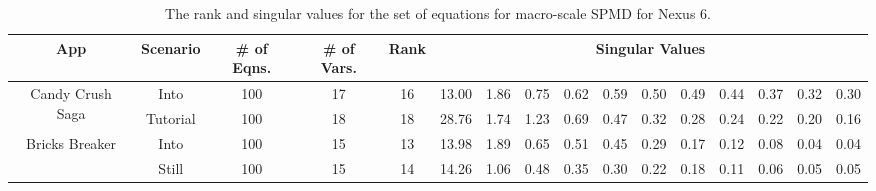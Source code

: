 \begin{table*}[tp]
{\small
    \centering
    \caption{The rank and singular values for the set of equations for macro-scale SPMD for Nexus 6.}
    \vspace{-0.1in}
    \begin{tabular}{|c|c|c|c|c|c|c|c|c|c|c|c|c|c|c|c|}
    \hline
        App & Scenario & \# of Eqns. & \# of Vars. & Rank &  \multicolumn{11}{c|}{Singular Values} \\
        \hline
        \multirow{2}{15mm}{Candy Crush Saga} & Into & 100 & 17 & 16 & 13.00  & 1.86  & 0.75  & 0.62  & 0.59  & 0.50  & 0.49  & 0.44  & 0.37  & 0.32  & 0.30 \\
        \cline{2-16}
	     & Tutorial &  100 & 18 & 18 & 28.76  & 1.74  & 1.23  & 0.69  & 0.47  & 0.32  & 0.28  & 0.24  & 0.22  & 0.20  & 0.16\\
	     \hline
	     \multirow{2}{15mm}{Bricks Breaker} & Into & 100 & 15 & 13 & 13.98  & 1.89  & 0.65  & 0.51  & 0.45  & 0.29  & 0.17  & 0.12  & 0.08  & 0.04  & 0.04 \\
         \cline{2-16}
         & Still & 100 & 15 & 14 & 14.26  & 1.06  & 0.48  & 0.35  & 0.30  & 0.22  & 0.18  & 0.11  & 0.06  & 0.05  & 0.05 \\
         \hline
    \end{tabular}
    \label{tab:macro_singularvalues_nexus6}
    \vspace{-0.1in}
}
\end{table*}

